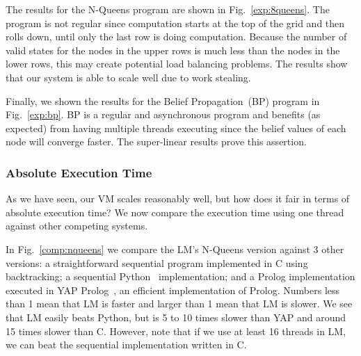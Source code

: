 The results for the N-Queens program are shown in Fig.~\ref{exp:8queens}. The program is not regular since computation starts at the top of the grid and then rolls down, until only the last row is doing computation. Because the number of valid states for the nodes in the upper rows is much less than the nodes in the lower rows, this may create potential load balancing problems. The results show that our system is able to scale well due to work stealing.

Finally, we shown the results for the Belief Propagation~(BP) program in Fig.~\ref{exp:bp}. BP is a regular and asynchronous program
and benefits (as expected) from having multiple threads executing since the belief values of each node will converge faster.
The super-linear results prove this assertion.

\subsubsection{Absolute Execution Time}

As we have seen, our VM scales reasonably well, but how does it fair in terms of absolute execution time? We now compare the execution
time using one thread against other competing systems.

In Fig.~\ref{comp:nqueens} we compare the LM's N-Queens version against 3 other versions: a straightforward sequential program implemented
in C using backtracking; a sequential Python~\cite{vanRossum:1995:PRM} implementation; and a Prolog implementation executed in
YAP Prolog~\cite{DBLP:journals/corr/abs-1102-3896}, an efficient implementation of Prolog. Numbers less than 1 mean that LM
is faster and larger than 1 mean that LM is slower. We see that LM easily beats Python, but is 5 to 10 times slower than YAP
and around 15 times slower than C.
However, note that if we use at least 16 threads in LM, we can beat the sequential implementation written in C.


